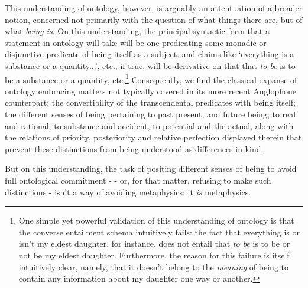 \documentclass[]{article}
\begin{document}
This understanding of ontology, 
however, 
is arguably 
an attentuation of a broader notion,
concerned not primarily with the question of what things there are, but of what \emph{being is}. 
On this understanding, 
the principal syntactic form that a statement in ontology will take will be one predicating some monadic or disjunctive predicate of being itself as a subject. 
and claims like `everything is a substance or a quantity...', etc., 
if true, 
will be derivative on that that \emph{to be} is to be a substance or a quantity, etc.\footnote{
One simple yet powerful validation of this understanding of ontology is that the converse entailment schema intuitively fails: 
the fact that everything is or isn't my eldest daughter, for instance, 
does not entail that \emph{to be} is to be or not be my eldest daughter. 
Furthermore, the reason for this failure is itself intuitively clear, 
namely, 
that it doesn't belong to the \emph{meaning} of being to contain any information about my daughter one way or another.
}
Consequently, we find the classical expanse of ontology embracing matters not typically covered in its more recent Anglophone counterpart: 
the convertibility of the transcendental predicates with being itself;  
the different senses of being pertaining 
to past present, and future being;
to real and rational;
to substance and accident, 
to potential and the actual, 
along with the relations of priority, posteriority and relative perfection displayed therein
that prevent these distinctions from being understood as differences in kind. 

But on this understanding, the task of positing different senses of being to avoid full ontological commitment - 
- or, for that matter, refusing to make such distinctions - 
isn't a way of avoiding metaphysics: it \emph{is} metaphysics.
\end{document}

